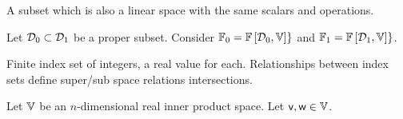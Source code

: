 A subset which is also a linear space with the
same scalars and operations.


\begin{example}
\bigskip
Let $\mathcal{D}_0 \subset \mathcal{D}_1$ be a proper subset.
Consider 
$\mathbb{F}_0 = \mathbb{F} \left[ \mathcal{D}_0, \mathbb{V} \right] \}$
and
$\mathbb{F}_1 = \mathbb{F} \left[ \mathcal{D}_1, \mathbb{V} \right] \}$.
\end{example}

\begin{example}
\bigskip
Finite index set of integers, a real value for each.
Relationships between index sets define super/sub space relations
intersections.
\end{example}
Let $\mathbb{V}$ be an $n$-dimensional real inner product space.
Let $\mathsf{v}, \mathsf{w} \in \mathbb{V}$.

